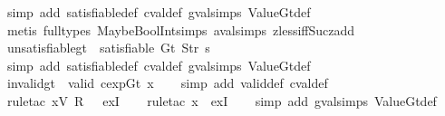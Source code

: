 \begin{isabellebody}
%
\isatagproof
{}\isamarkupfalse%
\ {\isacharparenleft}simp\ add{\isacharcolon}\ satisfiable{\isacharunderscore}def\ cval{\isacharunderscore}def\ gval{\isachardot}simps\ ValueGt{\isacharunderscore}def{\isacharparenright}\isanewline
\ \ \isamarkupfalse%
\ {\isacharparenleft}metis\ {\isacharparenleft}full{\isacharunderscore}types{\isacharparenright}\ MaybeBoolInt{\isachardot}simps{\isacharparenleft}{}{\isacharparenright}\ aval{\isachardot}simps{\isacharparenleft}{}{\isacharparenright}\ zless{\isacharunderscore}iff{\isacharunderscore}Suc{\isacharunderscore}zadd{\isacharparenright}%
\endisatagproof
{\isafoldproof}%
%
\isadelimproof
\isanewline
%
\endisadelimproof
\isanewline
{}\isamarkupfalse%
\ unsatisfiable{\isacharunderscore}gt{\isacharcolon}\ {\isachardoublequoteopen}{\isasymnot}\ satisfiable\ {\isacharparenleft}Gt\ {\isacharparenleft}Str\ s{\isacharparenright}{\isacharparenright}{\isachardoublequoteclose}\isanewline
%
\isadelimproof
\ \ %
\endisadelimproof
%
\isatagproof
{}\isamarkupfalse%
\ {\isacharparenleft}simp\ add{\isacharcolon}\ satisfiable{\isacharunderscore}def\ cval{\isacharunderscore}def\ gval{\isachardot}simps\ ValueGt{\isacharunderscore}def{\isacharparenright}%
\endisatagproof
{\isafoldproof}%
%
\isadelimproof
\isanewline
%
\endisadelimproof
\isanewline
{}\isamarkupfalse%
\ invalid{\isacharunderscore}gt{\isacharcolon}\ {\isachardoublequoteopen}{\isasymnot}\ valid\ {\isacharparenleft}cexp{\isachardot}Gt\ x{}{\isacharparenright}{\isachardoublequoteclose}\isanewline
%
\isadelimproof
\ \ %
\endisadelimproof
%
\isatagproof
{}\isamarkupfalse%
\ {\isacharparenleft}simp\ add{\isacharcolon}\ valid{\isacharunderscore}def\ cval{\isacharunderscore}def{\isacharparenright}\isanewline
\ \ \isamarkupfalse%
\ {\isacharparenleft}rule{\isacharunderscore}tac\ x{\isacharequal}{\isachardoublequoteopen}V\ {\isacharparenleft}R\ {}{\isacharparenright}{\isachardoublequoteclose}\ \ exI{\isacharparenright}\isanewline
\ \ \isamarkupfalse%
\ {\isacharparenleft}rule{\isacharunderscore}tac\ x{\isacharequal}{\isachardoublequoteopen}{\isacharless}{\isachargreater}{\isachardoublequoteclose}\ \ exI{\isacharparenright}\isanewline
\ \ \isamarkupfalse%
\ {\isacharparenleft}simp\ add{\isacharcolon}\ gval{\isachardot}simps\ ValueGt{\isacharunderscore}def{\isacharparenright}%
\endisatagproof
{\isafoldproof}%
%
\isadelimproof
\isanewline
%
\endisadelimproof
\isanewline

\end{isabellebody}
